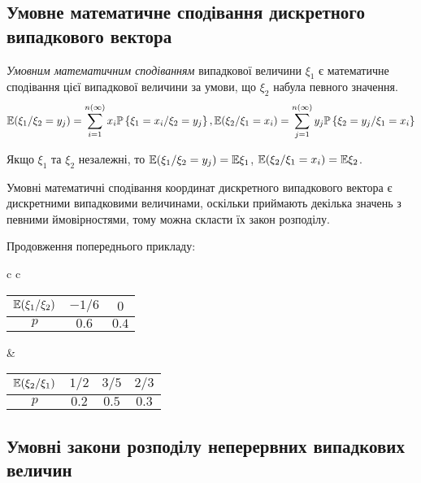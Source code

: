 \subsection{Умовне математичне сподівання дискретного випадкового вектора}
\begin{definition}
    \emph{Умовним математичним сподіванням} випадкової величини $\xi_1$ 
    є математичне сподівання цієї випадкової величини за умови, що 
    $\xi_2$ набула певного значення.
    $$\mathbb{E}(\xi_1 / \xi_2 = y_j) =
\sum\limits_{i=1}^{n(\infty)}x_i 
\mathbb{P}\left\{\xi_1 = x_i / \xi_2 = y_j\right\}, 
\mathbb{E}(\xi_2 / \xi_1 = x_i) = \sum\limits_{j=1}^{n(\infty)}y_j 
\mathbb{P}\left\{\xi_2 = y_j / \xi_1 = x_i\right\}$$
\end{definition}

\begin{remark}
    Якщо $\xi_1$ та $\xi_2$ незалежні, то $\mathbb{E}(\xi_1 / \xi_2 = y_j) 
    = \mathbb{E}\xi_1$, $\mathbb{E}(\xi_2 / \xi_1 = x_i) = \mathbb{E}\xi_2$.
\end{remark}

Умовні математичні сподівання координат дискретного випадкового вектора є дискретними випадковими величинами, оскільки 
приймають декілька значень з певними ймовірностями, тому можна скласти 
їх закон розподілу.
\begin{example}
    Продовження попереднього прикладу:

    \begin{tabular}{c c}
        \begin{tabular}{|c|c|c|}
            \hline
            $\mathbb{E}(\xi_1 / \xi_2)$ & $-1/6$ & $0$ \\
            \hline
            $p$ & $0.6$ & $0.4$ \\
            \hline
        \end{tabular}
        &
        \begin{tabular}{|c|c|c|c|}
            \hline
            $\mathbb{E}(\xi_2 / \xi_1)$ & $1/2$ & $3/5$ & $2/3$ \\
            \hline
            $p$ & $0.2$ & $0.5$ & $0.3$ \\
            \hline
        \end{tabular}
    \end{tabular}
\end{example}

\subsection{Умовні закони розподілу неперервних випадкових величин}

